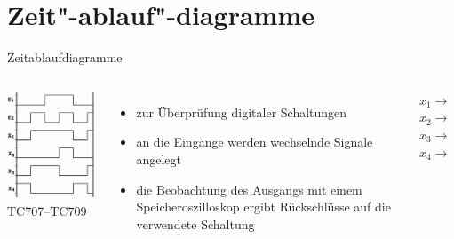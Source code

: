 \section{Zeit"-ablauf"-diagramme}
\begin{frame}{Zeitablaufdiagramme}
  \begin{columns}
    \includegraphics[width=\textwidth,height=.8\textheight,keepaspectratio]{a14/tc707.png}\\
    {\tiny TC707--TC709 \hyperlink{refs}{\cite{bna}}}
    \begin{itemize}
      \item zur Überprüfung digitaler Schaltungen
      \item an die Eingänge werden wechselnde Signale angelegt
      \item die Beobachtung des Ausgangs mit einem Speicheroszilloskop ergibt Rückschlüsse auf die verwendete Schaltung
    \end{itemize}
    \pause
    \begin{description}
      \item[$x_1\rightarrow$] 
      \item[$x_2\rightarrow$] 
      \item[$x_3\rightarrow$] 
      \item[$x_4\rightarrow$] 
    \end{description}
  \end{columns}
\end{frame}

